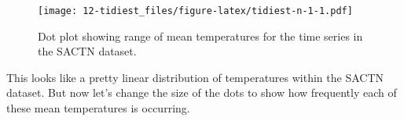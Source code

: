 \documentclass[]{book}
\newenvironment{Shaded}{\begin{snugshade}}{\end{snugshade}}
\newcommand{\KeywordTok}[1]{\textcolor[rgb]{0.13,0.29,0.53}{\textbf{#1}}}
\newcommand{\DataTypeTok}[1]{\textcolor[rgb]{0.13,0.29,0.53}{#1}}
\newcommand{\DecValTok}[1]{\textcolor[rgb]{0.00,0.00,0.81}{#1}}
\newcommand{\StringTok}[1]{\textcolor[rgb]{0.31,0.60,0.02}{#1}}
\newcommand{\OperatorTok}[1]{\textcolor[rgb]{0.81,0.36,0.00}{\textbf{#1}}}
\newcommand{\NormalTok}[1]{#1}
\theoremstyle{definition}
\theoremstyle{definition}
\theoremstyle{definition}
\theoremstyle{remark}
\begin{document}
\begin{Shaded}
\end{Shaded}

\begin{figure}
\centering
\texttt{[image: 12-tidiest\_files/figure-latex/tidiest-n-1-1.pdf]}
\caption{\label{fig:tidiest-n-1}Dot plot showing range of mean temperatures
for the time series in the SACTN dataset.}
\end{figure}

This looks like a pretty linear distribution of temperatures within the
SACTN dataset. But now let's change the size of the dots to show how
frequently each of these mean temperatures is occurring.
\end{document}
